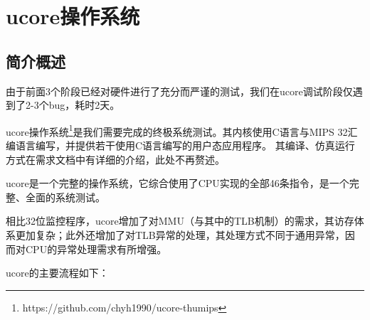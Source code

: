 \chapter{ucore操作系统}

\section{简介概述}

由于前面3个阶段已经对硬件进行了充分而严谨的测试，我们在ucore调试阶段仅遇到了2-3个bug，耗时2天。

ucore操作系统\footnote{https://github.com/chyh1990/ucore-thumips}是我们需要完成的终极系统测试。其内核使用C语言与MIPS 32汇编语言编写，并提供若干使用C语言编写的用户态应用程序。
其编译、仿真运行方式在需求文档中有详细的介绍，此处不再赘述。

ucore是一个完整的操作系统，它综合使用了CPU实现的全部46条指令，是一个完整、全面的系统测试。

相比32位监控程序，ucore增加了对MMU（与其中的TLB机制）的需求，其访存体系更加复杂；此外还增加了对TLB异常的处理，其处理方式不同于通用异常，因而对CPU的异常处理需求有所增强。

ucore的主要流程如下：

